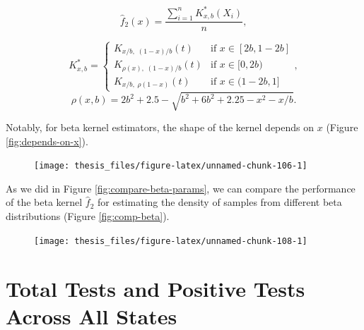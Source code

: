 \documentclass[12pt,twoside]{smiththesis}
\begin{document}
\[
\hat f_2(x)  = \dfrac{\sum_{i=1}^n K_{x,b}^*(X_i)}{n},\]

\[K^*_{x,b} = \begin{cases}K_{x/b, \; (1-x)/b }(t)  & \text{if }x \in [2b,1-2b] \\
K_{\rho(x), \; (1-x)/b } (t)  & \text{if } x \in [0,2b) \\
K_{x/b, \; \rho(1-x)}(t) & \text{if } x\in(1-2b,1]
\end{cases},
\]
\[\rho(x,b) = 2b^2 + 2.5 - \sqrt{b^2 + 6b^2 +2.25-x^2 -x/b}.\]

Notably, for beta kernel estimators, the shape of the kernel depends on \(x\) (Figure \ref{fig:depends-on-x}).
\begin{figure}

{\centering \texttt{[image: thesis\_files/figure-latex/unnamed-chunk-106-1]} 

}

\caption{\label{fig:depends-on-x}}\label{fig:unnamed-chunk-106}
\end{figure}
As we did in Figure \ref{fig:compare-beta-params}, we can compare the performance of the beta kernel \(\hat f_2\) for estimating the density of samples from different beta distributions (Figure \ref{fig:comp-beta}).
\begin{figure}

{\centering \texttt{[image: thesis\_files/figure-latex/unnamed-chunk-108-1]} 

}

\caption{\label{fig:comp-beta}}\label{fig:unnamed-chunk-108}
\end{figure}
\hypertarget{total-tests-and-positive-tests-across-all-states}{%
\section{Total Tests and Positive Tests Across All States}\label{total-tests-and-positive-tests-across-all-states}}
\end{document}

